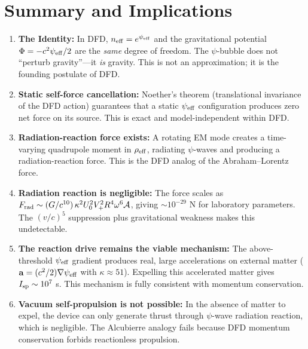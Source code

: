 \documentclass[11pt]{article}
\newcommand{\psieff}{\psi_{\rm eff}}
\newcommand{\neff}{n_{\rm eff}}
\newcommand{\avec}{\mathbf{a}}
\begin{document}
\section{Summary and Implications}\label{sec:summary}

\begin{tcolorbox}[colback=green!5!white, colframe=green!50!black,
  title=Central Results]

\begin{enumerate}
\item \textbf{The Identity:} In DFD, $\neff = e^{\psieff}$ and the
  gravitational potential $\Phi = -c^2\psieff/2$ are the \emph{same}
  degree of freedom. The $\psi$-bubble does not ``perturb gravity''---it
  \emph{is} gravity. This is not an approximation; it is the founding
  postulate of DFD.

\item \textbf{Static self-force cancellation:} Noether's theorem
  (translational invariance of the DFD action) guarantees that a static
  $\psieff$ configuration produces zero net force on its source. This is
  exact and model-independent within DFD.

\item \textbf{Radiation-reaction force exists:} A rotating EM mode
  creates a time-varying quadrupole moment in $\rho_{\rm eff}$, radiating
  $\psi$-waves and producing a radiation-reaction force. This is the
  DFD analog of the Abraham--Lorentz force.

\item \textbf{Radiation reaction is negligible:} The force scales as
  $F_{\rm rad} \sim (G/c^{10})\,\kappa^2 U_0^2 V_+^2 R^4 \omega^6
  \mathcal{A}$, giving $\sim 10^{-29}$ N for laboratory parameters.
  The $(v/c)^5$ suppression plus gravitational weakness makes this
  undetectable.

\item \textbf{The reaction drive remains the viable mechanism:} The
  above-threshold $\psieff$ gradient produces real, large accelerations on
  external matter ($\avec = (c^2/2)\nabla\psieff$ with $\kappa \approx 51$).
  Expelling this accelerated matter gives $I_{\rm sp} \sim 10^7$ s. This
  mechanism is fully consistent with momentum conservation.

\item \textbf{Vacuum self-propulsion is not possible:} In the absence of
  matter to expel, the device can only generate thrust through
  $\psi$-wave radiation reaction, which is negligible. The Alcubierre
  analogy fails because DFD momentum conservation forbids reactionless
  propulsion.
\end{enumerate}
\end{tcolorbox}
\end{document}
